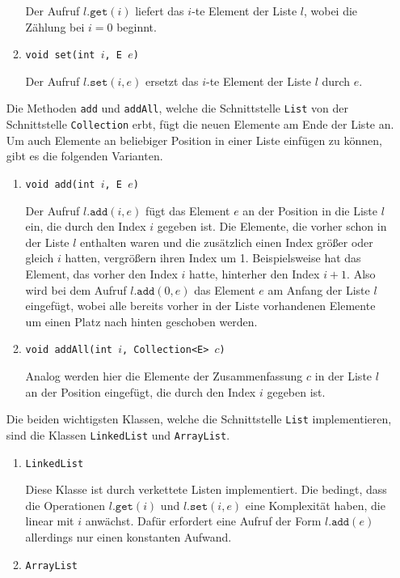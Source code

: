 \begin{enumerate}
\begin{enumerate}
            Der Aufruf $l.\mathtt{get}(i)$ liefert das $i$-te Element der Liste $l$, wobei
            die Z\"ahlung bei $i=0$ beginnt.
      \item \texttt{void set(int $i$, E $e$)}      

            Der Aufruf $l.\mathtt{set}(i, e)$ ersetzt das $i$-te Element der Liste
            $l$ durch $e$.
      \end{enumerate}
      Die Methoden \texttt{add} und \texttt{addAll}, welche die Schnittstelle \texttt{List} von
      der Schnittstelle \texttt{Collection} erbt, f\"ugt die neuen Elemente am Ende der Liste an.
      Um auch Elemente an beliebiger Position in einer Liste einf\"ugen zu k\"onnen, gibt es
      die folgenden Varianten.
      \begin{enumerate}
      \item \texttt{void add(int $i$, E $e$)}

            Der Aufruf $l.\mathtt{add}(i, e)$ f\"ugt das Element $e$
            an der Position in die Liste $l$ ein, die durch den Index $i$ gegeben ist.
            Die Elemente, die vorher schon in 
            der Liste $l$ enthalten waren und die zus\"atzlich einen Index gr\"o{\ss}er oder
            gleich $i$ hatten, vergr\"o{\ss}ern ihren Index um 1.  Beispielsweise hat das
            Element, das vorher den Index $i$ hatte, hinterher den Index $i+1$.
            Also wird bei dem Aufruf $l.\mathtt{add}(0,e)$ das Element $e$ am Anfang der
            Liste $l$ eingef\"ugt, wobei alle bereits vorher in der Liste vorhandenen
            Elemente um einen Platz nach hinten geschoben werden.
      \item \texttt{void addAll(int $i$, Collection<E> $c$)}

            Analog werden hier die Elemente der Zusammenfassung $c$ in
            der Liste $l$ an  der Position eingef\"ugt, die durch den Index $i$ gegeben ist.
      \end{enumerate}
      Die beiden wichtigsten Klassen, welche die Schnittstelle \texttt{List} implementieren, sind
      die Klassen \texttt{LinkedList} und \texttt{ArrayList}.
      \begin{enumerate}
      \item \texttt{LinkedList} 

            Diese Klasse ist durch verkettete Listen implementiert.  Die bedingt, dass die
            Operationen $l.\mathtt{get}(i)$ und $l.\mathtt{set}(i,e)$ eine Komplexit\"at
            haben, die linear mit $i$ anw\"achst.  Daf\"ur erfordert eine Aufruf der Form
            $l.\mathtt{add}(e)$ allerdings nur einen konstanten Aufwand.
      \item \texttt{ArrayList}


\end{enumerate}
\end{enumerate}
